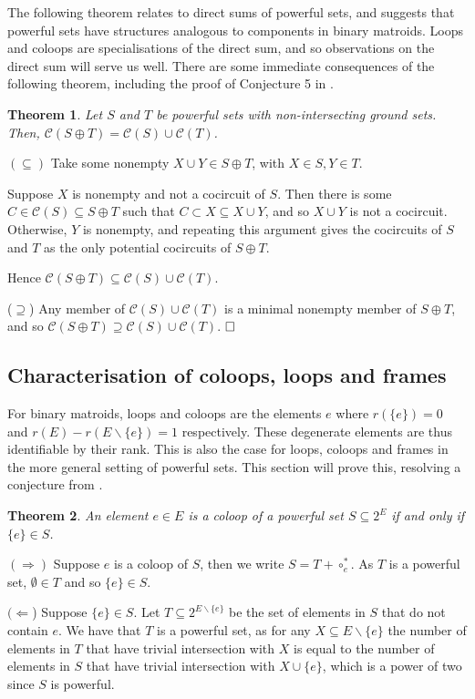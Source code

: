 \documentclass[10pt]{article}
\newtheorem{thm}{Theorem}[section]
\theoremstyle{definition}
\def\pf{\noindent {\it Proof.\ }}
\begin{document}
	
	The following theorem relates to direct sums of powerful sets, and suggests that powerful sets have structures analogous to components in binary matroids. Loops and coloops are specialisations of the direct sum, and so observations on the direct sum will serve us well. %
	There are some immediate consequences of the following theorem, including the proof of Conjecture 5 in \cite{farr2017}.
	\begin{thm} \label{thm:direct_sum}Let $S$ and $T$ be powerful sets with non-intersecting ground sets. Then,
		$\mathcal{C}(S\oplus T)=\mathcal{C}(S)\cup\mathcal{C}(T)$.\end{thm}
	
	\pf
	$(\subseteq)$ Take some nonempty $X\cup Y\in S\oplus T$, with $X\in S,Y\in T$.
	
		
	Suppose $X$ is nonempty and not a cocircuit of $S$. Then there is some $C\in\mathcal{C}(S)\subseteq S\oplus T$ such that $C\subset X\subseteq X\cup Y$, and so $X\cup Y$ is not a cocircuit. Otherwise, $Y$ is nonempty, and repeating this argument gives the cocircuits of $S$ and $T$ as the only potential cocircuits of $S\oplus T$.
	
	Hence $\mathcal{C}(S\oplus T)\subseteq \mathcal{C}(S)\cup\mathcal{C}(T)$.
	
	($\supseteq$) Any member of $\mathcal{C}(S)\cup\mathcal{C}(T)$ is a minimal nonempty member of $S\oplus T$, and so $\mathcal{C}(S\oplus T)\supseteq \mathcal{C}(S)\cup\mathcal{C}(T) $. $\hfill\Box$
	
\subsection{Characterisation of coloops, loops and frames}
	For binary matroids, loops and coloops are the elements $e$ where $r(\{e\})=0$ and $r(E)-r(E\backslash \{e\})=1$ respectively. These degenerate elements are thus identifiable by their rank. This is also the case for loops, coloops and frames in the more general setting of powerful sets. This section will prove this, resolving a conjecture from \cite{farr2017}.
	

	\begin{thm}\label{thm:coloops}
		An element $e\in E$ is a coloop of a powerful set $S\subseteq 2^E$ if and only if $\{e\}\in S$.	
	\end{thm}
\pf $(\Rightarrow)$ Suppose $e$ is a coloop of $S$, then we write $S=T+\circ_e^*$. As $T$ is a powerful set, 
$\emptyset\in T$ and so $\{e\}\in S$.

$(\Leftarrow$) Suppose $\{e\}\in S$. Let $T\subseteq 2^{E\backslash\{e\}}$ be the set of elements in $S$ that do not contain $e$. We have that $T$ is a powerful set, as for any $X\subseteq E\backslash\{e\}$ the number of elements in $T$ that have trivial intersection with $X$ is equal to the number of elements in $S$ that have trivial intersection with $X\cup\{e\}$, which is a power of two since $S$ is powerful.
\end{document}
